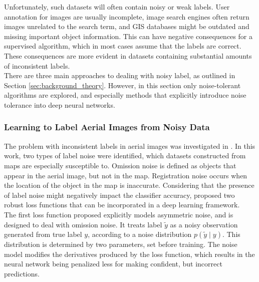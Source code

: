 Unfortunately, such datasets will often contain noisy or weak labels. User annotation for images are usually incomplete, image search engines often return images unrelated to the search term, and \ac{GIS} databases might be outdated and missing important object information. This can have negative consequences for a supervised algorithm, which in most cases assume that the labels are correct. These consequences are more evident in datasets containing substantial amounts of inconsistent labels.\\
 
There are three main approaches to dealing with noisy label, as outlined in Section \ref{sec:background_theory}. However, in this section only noise-tolerant algorithms are explored, and especially methods that explicitly introduce noise tolerance into deep neural networks.  


\subsubsection{Learning to Label Aerial Images from Noisy Data}
The problem with inconsistent labels in aerial images was investigated in \citep{Mnih_aerial_images_noisy}. In this work, two types of label noise were identified,  which datasets constructed from maps are especially susceptible to. Omission noise is defined as objects that appear in the aerial image, but not in the map. Registration noise occurs when the location of the object in the map is inaccurate. Considering that the presence of label noise might negatively impact the classifier accuracy, \cite{Mnih_aerial_images_noisy} proposed two robust loss functions that can be incorporated in a deep learning framework. \\

The first loss function proposed explicitly models asymmetric noise, and is designed to deal with omission noise. It treats label $\tilde{y}$ as a noisy observation generated from true label $y$, according to a noise distribution $p(\tilde{y} \mid y)$. This distribution is determined by two parameters, set before training. The noise model modifies the derivatives produced by the loss function, which results in the neural network being penalized less for making confident, but incorrect predictions. \\

